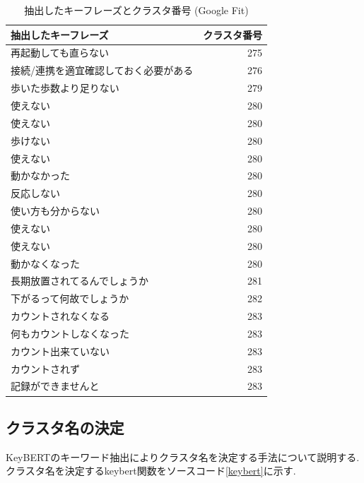 \begin{table}[H]
  \caption{抽出したキーフレーズとクラスタ番号 (Google Fit) }
  \label{tb:clustering}
  \begin{center}
  \begin{tabularx}{\linewidth}{X|r}
    \hline
    抽出したキーフレーズ&クラスタ番号\\\hline\hline
    再起動しても直らない&275\\\hline
    接続/連携を適宜確認しておく必要がある&276\\\hline
    歩いた歩数より足りない&279\\\hline
    使えない&280\\\hline
    使えない&280\\\hline
    歩けない&280\\\hline
    使えない&280\\\hline
    動かなかった&280\\\hline
    反応しない&280\\\hline
    使い方も分からない&280\\\hline
    使えない&280\\\hline
    使えない&280\\\hline
    動かなくなった&280\\\hline
    長期放置されてるんでしょうか&281\\\hline
    下がるって何故でしょうか&282\\\hline
    カウントされなくなる&283\\\hline
    何もカウントしなくなった&283\\\hline
    カウント出来ていない&283\\\hline
    カウントされず&283\\\hline
    記録ができませんと&283\\\hline
  \end{tabularx}\end{center}
\end{table}

\subsection{クラスタ名の決定}
KeyBERTのキーワード抽出によりクラスタ名を決定する手法について説明する. クラスタ名を決定するkeybert関数をソースコード\ref{keybert}に示す. 

